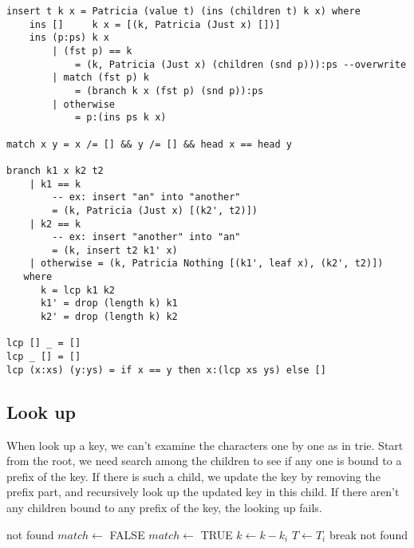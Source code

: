 \documentclass{article}
\begin{document}
\lstset{language=Haskell}
\begin{lstlisting}
insert t k x = Patricia (value t) (ins (children t) k x) where
    ins []     k x = [(k, Patricia (Just x) [])]
    ins (p:ps) k x
        | (fst p) == k
            = (k, Patricia (Just x) (children (snd p))):ps --overwrite
        | match (fst p) k
            = (branch k x (fst p) (snd p)):ps
        | otherwise
            = p:(ins ps k x)

match x y = x /= [] && y /= [] && head x == head y

branch k1 x k2 t2
    | k1 == k
        -- ex: insert "an" into "another"
        = (k, Patricia (Just x) [(k2', t2)])
    | k2 == k
        -- ex: insert "another" into "an"
        = (k, insert t2 k1' x)
    | otherwise = (k, Patricia Nothing [(k1', leaf x), (k2', t2)])
   where
      k = lcp k1 k2
      k1' = drop (length k) k1
      k2' = drop (length k) k2

lcp [] _ = []
lcp _ [] = []
lcp (x:xs) (y:ys) = if x == y then x:(lcp xs ys) else []
\end{lstlisting}


\subsection{Look up}
When look up a key, we can't examine the characters one by one
as in trie. Start from the root, we need search among the children
to see if any one is bound to a prefix of the key.
If there is such a child, we update the key by removing the prefix
part, and recursively look up the updated key in this child.
If there aren't any children bound to any prefix of the key,
the looking up fails.

\begin{algorithmic}[1]
     \State \Return not found
   \EndIf
  \Repeat
    \State $match \gets$ FALSE
        \State \Return {}
      \EndIf
        \State $match \gets$ TRUE
        \State $k \gets k - k_i$
        \State $T \gets T_i$
        \State break
      \EndIf
    \EndFor
  \State \Return not found
\EndFunction
\end{algorithmic}
\end{document}
